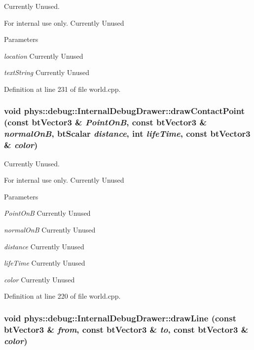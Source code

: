 Currently Unused. 

\begin{DoxyInternal}{For internal use only.}
Currently Unused 
\begin{DoxyParams}{Parameters}
\item[{\em location}]Currently Unused \item[{\em textString}]Currently Unused \end{DoxyParams}
\end{DoxyInternal}


Definition at line 231 of file world.cpp.

\hypertarget{classphys_1_1debug_1_1InternalDebugDrawer_a8b912aaff8dfd9f4e97ffb2d867121b2}{
\subsubsection[{drawContactPoint}]{\setlength{\rightskip}{0pt plus 5cm}void phys::debug::InternalDebugDrawer::drawContactPoint (const btVector3 \& {\em PointOnB}, \/  const btVector3 \& {\em normalOnB}, \/  btScalar {\em distance}, \/  int {\em lifeTime}, \/  const btVector3 \& {\em color})}}
\label{db/d27/classphys_1_1debug_1_1InternalDebugDrawer_a8b912aaff8dfd9f4e97ffb2d867121b2}


Currently Unused. 

\begin{DoxyInternal}{For internal use only.}
Currently Unused 
\begin{DoxyParams}{Parameters}
\item[{\em PointOnB}]Currently Unused \item[{\em normalOnB}]Currently Unused \item[{\em distance}]Currently Unused \item[{\em lifeTime}]Currently Unused \item[{\em color}]Currently Unused \end{DoxyParams}
\end{DoxyInternal}


Definition at line 220 of file world.cpp.

\hypertarget{classphys_1_1debug_1_1InternalDebugDrawer_a8a35c3c80fddaaec8e21f737ed1b3938}{
\subsubsection[{drawLine}]{\setlength{\rightskip}{0pt plus 5cm}void phys::debug::InternalDebugDrawer::drawLine (const btVector3 \& {\em from}, \/  const btVector3 \& {\em to}, \/  const btVector3 \& {\em color})}}
\label{db/d27/classphys_1_1debug_1_1InternalDebugDrawer_a8a35c3c80fddaaec8e21f737ed1b3938}


